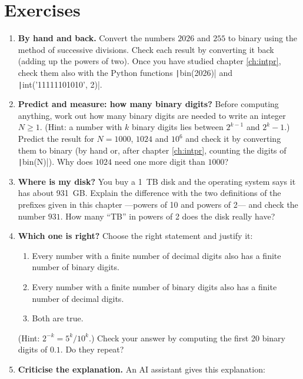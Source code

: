 \section{Exercises}
\begin{enumerate}
\item \label{ej:intro_binario-en} \textbf{By hand and back.} Convert the numbers $2026$ and $255$ to binary using the method of successive divisions. Check each result by converting it back (adding up the powers of two). Once you have studied chapter \ref{ch:intpr}, check them also with the Python functions \texttt|bin(2026)| and \texttt|int('11111101010', 2)|.

\item \label{ej:intro_cifras-en} \textbf{Predict and measure: how many binary digits?} Before computing anything, work out how many binary digits are needed to write an integer $N\geq1$. (Hint: a number with $k$ binary digits lies between $2^{k-1}$ and $2^k-1$.) Predict the result for $N=1000$, $1024$ and $10^6$ and check it by converting them to binary (by hand or, after chapter \ref{ch:intpr}, counting the digits of \texttt|bin(N)|). Why does $1024$ need one more digit than $1000$?

\item \label{ej:intro_disco-en} \textbf{Where is my disk?} You buy a 1~TB disk and the operating system says it has about 931~GB. Explain the difference with the two definitions of the prefixes given in this chapter ---powers of 10 and powers of 2--- and check the number $931$. How many ``TB'' in powers of 2 does the disk really have?

\item \label{ej:intro_cual-en} \textbf{Which one is right?} Choose the right statement and justify it:
\begin{enumerate}
\item Every number with a finite number of decimal digits also has a finite number of binary digits.
\item Every number with a finite number of binary digits also has a finite number of decimal digits.
\item Both are true.
\end{enumerate}
(Hint: $2^{-k}=5^k/10^k$.) Check your answer by computing the first 20 binary digits of $0.1$. Do they repeat?

\item \label{ej:intro_ia-en} \textbf{Criticise the explanation.} An AI assistant gives this explanation:


\end{enumerate}
